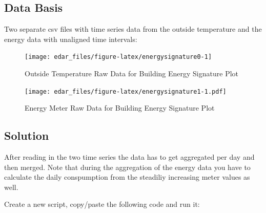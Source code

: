 \documentclass[
  a4paperpaper,
]{book}
\begin{document}
\hypertarget{data-basis-18}{%
\subsection{Data Basis}\label{data-basis-18}}

Two separate csv files with time series data from the outside temperature and the energy data with unaligned time intervals:

\begin{figure}
\texttt{[image: edar\_files/figure-latex/energysignature0-1]} \caption{Outside Temperature Raw Data for Building Energy Signature Plot}\label{fig:energysignature0}
\end{figure}

\begin{figure}
\centering
\texttt{[image: edar\_files/figure-latex/energysignature1-1.pdf]}
\caption{\label{fig:energysignature1}Energy Meter Raw Data for Building Energy Signature Plot}
\end{figure}

\newpage

\hypertarget{solution-18}{%
\subsection{Solution}\label{solution-18}}

After reading in the two time series the data has to get aggregated per day and then merged. Note that during the aggregation of the energy data you have to calculate the daily conspumption from the steadiliy increasing meter values as well.

Create a new script, copy/paste the following code and run it:
\end{document}

